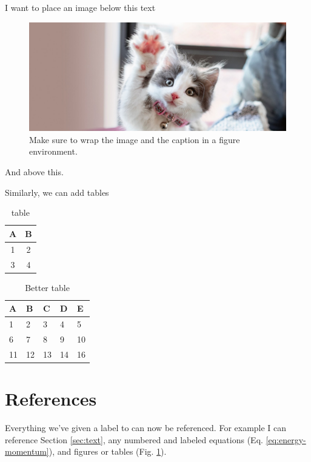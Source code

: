 \documentclass[12pt]{report}
\begin{document}
    I want to place an image below this text
    \begin{figure}[h!]
        \centering
        \includegraphics[width=\textwidth]{kitten.png}
        \caption{Make sure to wrap the image and the caption in a figure environment.}
        \label{fig:kitten}
    \end{figure}

    And above this.

    Similarly, we can add tables
    \begin{table}[h]
        \centering
        \begin{tabular}{|c|c|}
            \hline
            \textbf{A} & \textbf{B}\\
            \hline
            1 & 2 \\
            \hline
            3 & 4 \\
            \hline
        \end{tabular}
        
        \caption{table}
        \label{tab:my_label}
    \end{table}

    \lipsum[1]
    \begin{table}[h]
        \centering
        
        \begin{tabular}{lllll}
            \toprule
            A  & B  & C  & D  & E  \\
            \midrule
            1  & 2  & 3  & 4  & 5  \\
            6  & 7  & 8  & 9  & 10 \\
            11 & 12 & 13 & 14 & 16 \\
            \bottomrule
        \end{tabular}
        
        \caption{Better table}
        \label{tab:better_table}
        
    \end{table}



\section{References}
    Everything we've given a label to can now be referenced. For example I can reference Section \ref{sec:text}, any numbered and labeled equations (Eq. \ref{eq:energy-momentum}), and figures or tables (Fig. \ref{fig:kitten}).
    
    
\end{document}
